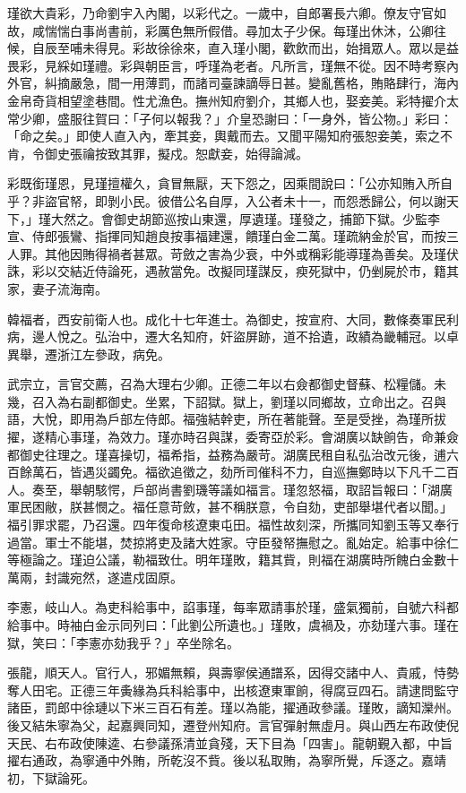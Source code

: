 \begin{pinyinscope}
瑾欲大貴彩，乃命劉宇入內閣，以彩代之。一歲中，自郎署長六卿。僚友守官如故，咸惴惴白事尚書前，彩厲色無所假借。尋加太子少保。每瑾出休沐，公卿往候，自辰至哺未得見。彩故徐徐來，直入瑾小閣，歡飲而出，始揖眾人。眾以是益畏彩，見綵如瑾禮。彩與朝臣言，呼瑾為老者。凡所言，瑾無不從。因不時考察內外官，糾摘嚴急，間一用薄罰，而諸司臺諫謫辱日甚。變亂舊格，賄賂肆行，海內金帛奇貨相望塗巷間。性尤漁色。撫州知府劉介，其鄉人也，娶妾美。彩特擢介太常少卿，盛服往賀曰：「子何以報我？」介皇恐謝曰：「一身外，皆公物。」彩曰：「命之矣。」即使人直入內，牽其妾，輿戴而去。又聞平陽知府張恕妾美，索之不肯，令御史張禴按致其罪，擬戍。恕獻妾，始得論減。

彩既銜瑾恩，見瑾擅權久，貪冒無厭，天下怨之，因乘間說曰：「公亦知賄入所自乎？非盜官帑，即剝小民。彼借公名自厚，入公者未十一，而怨悉歸公，何以謝天下，」瑾大然之。會御史胡節巡按山東還，厚遺瑾。瑾發之，捕節下獄。少監李宣、侍郎張鸞、指揮同知趙良按事福建還，饋瑾白金二萬。瑾疏納金於官，而按三人罪。其他因賄得禍者甚眾。苛斂之害為少衰，中外或稱彩能導瑾為善矣。及瑾伏誅，彩以交結近侍論死，遇赦當免。改擬同瑾謀反，瘐死獄中，仍剉屍於市，籍其家，妻子流海南。

韓福者，西安前衛人也。成化十七年進士。為御史，按宣府、大同，數條奏軍民利病，邊人悅之。弘治中，遷大名知府，奸盜屏跡，道不拾遺，政績為畿輔冠。以卓異舉，遷浙江左參政，病免。

武宗立，言官交薦，召為大理右少卿。正德二年以右僉都御史督蘇、松糧儲。未幾，召入為右副都御史。坐累，下詔獄。獄上，劉瑾以同鄉故，立命出之。召與語，大悅，即用為戶部左侍郎。福強結幹吏，所在著能聲。至是受挫，為瑾所拔擢，遂精心事瑾，為效力。瑾亦時召與謀，委寄亞於彩。會湖廣以缺餉告，命兼僉都御史往理之。瑾喜操切，福希指，益務為嚴苛。湖廣民租自私弘治改元後，逋六百餘萬石，皆遇災蠲免。福欲追徵之，劾所司催科不力，自巡撫鄭時以下凡千二百人。奏至，舉朝駭愕，戶部尚書劉璣等議如福言。瑾忽怒福，取詔旨報曰：「湖廣軍民困敝，朕甚憫之。福任意苛斂，甚不稱朕意，令自劾，吏部舉堪代者以聞。」福引罪求罷，乃召還。四年復命核遼東屯田。福性故刻深，所攜同知劉玉等又奉行過當。軍士不能堪，焚掠將吏及諸大姓家。守臣發帑撫慰之。亂始定。給事中徐仁等極論之。瑾迫公議，勒福致仕。明年瑾敗，籍其貲，則福在湖廣時所餽白金數十萬兩，封識宛然，遂遣戍固原。

李憲，岐山人。為吏科給事中，諂事瑾，每率眾請事於瑾，盛氣獨前，自號六科都給事中。時袖白金示同列曰：「此劉公所遺也。」瑾敗，虞禍及，亦劾瑾六事。瑾在獄，笑曰：「李憲亦劾我乎？」卒坐除名。

張龍，順天人。官行人，邪媚無賴，與壽寧侯通譜系，因得交諸中人、貴戚，恃勢奪人田宅。正德三年夤緣為兵科給事中，出核遼東軍餉，得腐豆四石。請逮問監守諸臣，罰郎中徐璉以下米三百石有差。瑾以為能，擢通政參議。瑾敗，謫知灤州。後又結朱寧為父，起嘉興同知，遷登州知府。言官彈射無虛月。與山西左布政使倪天民、右布政使陳逵、右參議孫清並貪殘，天下目為「四害」。龍朝覲入都，中旨擢右通政，為寧通中外賄，所乾沒不貲。後以私取賄，為寧所覺，斥逐之。嘉靖初，下獄論死。


\end{pinyinscope}
